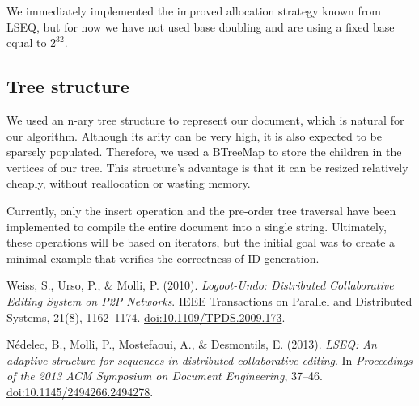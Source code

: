 \documentclass[12pt]{article}
\begin{document}
We immediately implemented the improved allocation strategy known from LSEQ, but for now we have not used base doubling and are using a fixed base equal to \(2^{32}\).

\subsection{Tree structure}
We used an n-ary tree structure to represent our document, which is natural for our algorithm. Although its arity can be very high, it is also expected to be sparsely populated. Therefore, we used a BTreeMap to store the children in the vertices of our tree. This structure's advantage is that it can be resized relatively cheaply, without reallocation or wasting memory.

Currently, only the insert operation and the pre-order tree traversal have been implemented to compile the entire document into a single string. Ultimately, these operations will be based on iterators, but the initial goal was to create a minimal example that verifies the correctness of ID generation.

\begin{thebibliography}{9}

Weiss, S., Urso, P., \& Molli, P. (2010).
\textit{Logoot-Undo: Distributed Collaborative Editing System on P2P Networks}.
IEEE Transactions on Parallel and Distributed Systems, 21(8), 1162--1174.
\href{https://doi.org/10.1109/TPDS.2009.173}{doi:10.1109/TPDS.2009.173}.

Nédelec, B., Molli, P., Mostefaoui, A., \& Desmontils, E. (2013).
\textit{LSEQ: An adaptive structure for sequences in distributed collaborative editing}.
In \textit{Proceedings of the 2013 ACM Symposium on Document Engineering}, 37--46.
\href{https://doi.org/10.1145/2494266.2494278}{doi:10.1145/2494266.2494278}.

\end{thebibliography}
\end{document}
